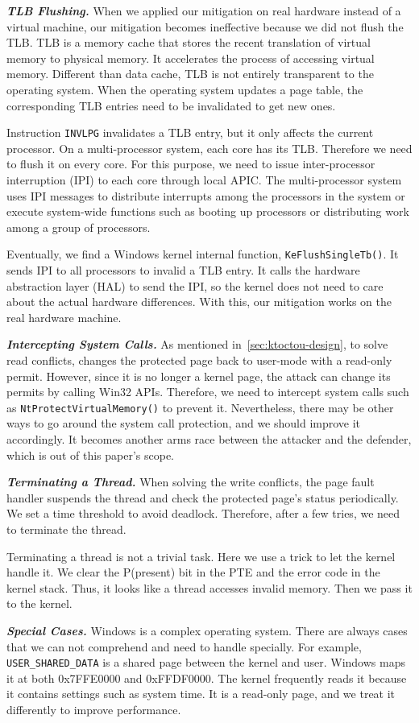 \textbf{\textit{TLB Flushing.}} When we applied our mitigation on real hardware instead of a virtual machine, our mitigation becomes ineffective because we did not flush the TLB.  TLB is a memory cache that stores the recent translation of virtual memory to physical memory. It accelerates the process of accessing virtual memory. Different than data cache, TLB is not entirely transparent to the operating system. When the operating system updates a page table, the corresponding TLB entries need to be invalidated to get new ones.

Instruction \texttt{INVLPG} invalidates a TLB entry, but it only affects the current processor. On a multi-processor system, each core has its TLB. Therefore we need to flush it on every core. For this purpose, we need to issue inter-processor interruption (IPI) to each core through local APIC. The multi-processor system uses IPI messages to distribute interrupts among the processors in the system or execute system-wide functions such as booting up processors or distributing work among a group of processors.

Eventually, we find a Windows kernel internal function, \texttt{KeFlushSingleTb()}. It sends IPI to all processors to invalid a TLB entry.  It calls the hardware abstraction layer (HAL) to send the IPI, so the kernel does not need to care about the actual hardware differences. With this, our mitigation works on the real hardware machine.


\textbf{\textit{Intercepting System Calls.}} As mentioned in~\autoref{sec:ktoctou-design}, to solve read conflicts, \name changes the protected page back to user-mode with a read-only permit. However, since it is no longer a kernel page, the attack can change its permits by calling Win32 APIs. Therefore, we need to intercept system calls  such as \texttt{NtProtectVirtualMemory()} to prevent it. Nevertheless, there may be other ways to go around the system call protection, and we should improve it accordingly. It becomes another arms race between the attacker and the defender, which is out of this paper's scope.



\textbf{\textit{Terminating a Thread.}} When solving the write conflicts, the page fault handler suspends the thread and check the protected page's status periodically. We set a time threshold to avoid deadlock. Therefore, after a few tries, we need to terminate the thread. 

Terminating a thread is not a trivial task. Here we use a trick to let the kernel handle it. We clear the P(present) bit in the PTE and the error code in the kernel stack. Thus, it looks like a thread accesses invalid memory. Then we pass it to the kernel.



\textbf{\textit{Special Cases.}} Windows is a complex operating system. There are always cases that we can not comprehend and need to handle specially. For example, \texttt{USER\_SHARED\_DATA} is a shared page between the kernel and user. Windows maps it at both 0x7FFE0000 and 0xFFDF0000. The kernel frequently reads it because it contains settings such as system time. It is a read-only page, and we treat it differently to improve performance. 
